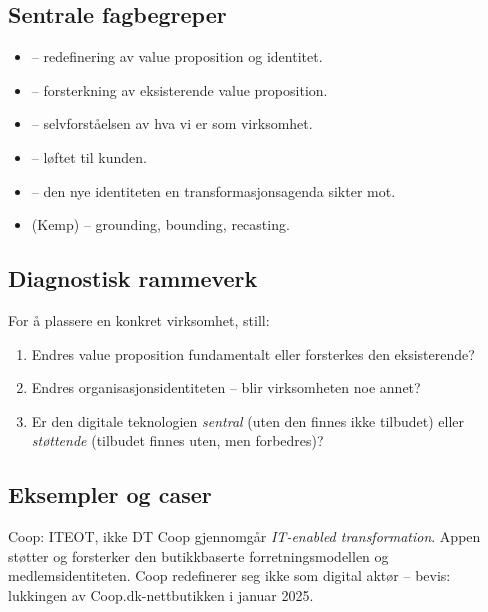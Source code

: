 \subsection{Sentrale fagbegreper}\label{terms:lec04}
\begin{itemize}
  \item {} -- redefinering av value proposition og
    identitet.
  \item {} -- forsterkning
    av eksisterende value proposition.
  \item {} -- selvforståelsen av \guillemotleft{}hva vi er som
    virksomhet\guillemotright{}.
  \item {} -- løftet til kunden.
  \item {} -- den nye identiteten en transformasjonsagenda
    sikter mot.
  \item {} (Kemp) -- grounding, bounding, recasting.
\end{itemize}

\subsection{Diagnostisk rammeverk}
For å plassere en konkret virksomhet, still:
\begin{enumerate}
  \item Endres value proposition fundamentalt eller forsterkes den eksisterende?
  \item Endres organisasjonsidentiteten -- blir virksomheten \guillemotleft{}noe annet\guillemotright{}?
  \item Er den digitale teknologien \emph{sentral} (uten den finnes ikke
    tilbudet) eller \emph{støttende} (tilbudet finnes uten, men forbedres)?
\end{enumerate}

\subsection{Eksempler og caser}
\begin{eksempelboks}{Coop: ITEOT, ikke DT}
Coop gjennomgår \emph{IT-enabled transformation}. Appen støtter og
forsterker den butikkbaserte forretningsmodellen og medlemsidentiteten. Coop
redefinerer seg ikke som digital aktør -- bevis: lukkingen av
Coop.dk-nettbutikken i januar 2025.
\end{eksempelboks}

